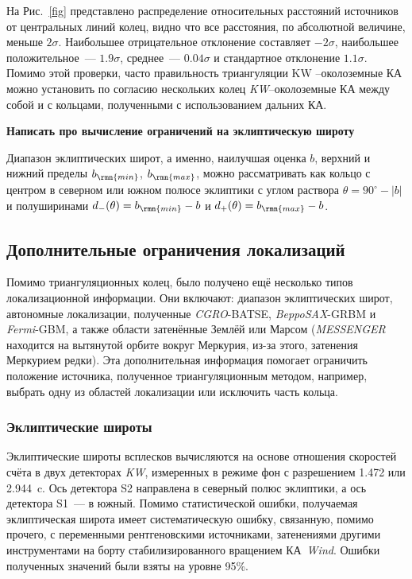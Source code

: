На Рис.~\ref{fig} представлено распределение относительных расстояний источников 
от центральных линий колец, видно что все расстояния, по абсолютной величине, меньше $2\sigma$.
Наибольшее отрицательное отклонение составляет $-2\sigma$, наибольшее положительное~---
$1.9\sigma$, среднее~--- $0.04\sigma$ и стандартное отклонение $1.1\sigma$.
Помимо этой проверки, часто правильность триангуляции KW –околоземные КА можно 
установить по согласию нескольких колец \textit{KW}--околоземные КА между собой 
и с кольцами, полученными с использованием дальних КА.

\textbf{Написать про вычисление ограничений на эклиптическую широту}

Диапазон эклиптических широт, а именно, наилучшая оценка $b$, верхний и нижний
пределы $b_{\rmn{min}}$, $b_{\rmn{max}}$, можно рассматривать как кольцо с центром в северном или южном
полюсе эклиптики с углом раствора $\theta = 90^\circ - |b|$ и полуширинами 
$d_{-}(\theta) = b_{\rmn{min}} - b$ и $d_{+}(\theta) = b_{\rmn{max}} - b$.

\subsection{Дополнительные ограничения локализаций}
Помимо триангуляционных колец, было получено ещё несколько типов локализационной информации. 
Они включают: диапазон эклиптических широт, автономные локализации, полученные 
\textit{CGRO}-BATSE, \textit{BeppoSAX}-GRBM и \textit{Fermi}-GBM, а также области 
затенённые Землёй или Марсом (\textit{MESSENGER} находится на вытянутой орбите вокруг Меркурия, из-за этого, 
затенения Меркурием редки). Эта дополнительная информация помогает ограничить 
положение источника, полученное триангуляционным методом, например, 
выбрать одну из областей локализации или исключить часть кольца.

\subsubsection{Эклиптические широты}
Эклиптические широты всплесков вычисляются на основе отношения скоростей счёта
в двух детекторах \textit{KW}, измеренных в режиме фон с разрешением 1.472 или 2.944~c. Ось
детектора S2 направлена в северный полюс эклиптики, а ось детектора S1~--- в южный.
Помимо статистической ошибки, получаемая эклиптическая широта имеет систематическую 
ошибку, связанную, помимо прочего, с переменными рентгеновскими источниками,
затенениями другими инструментами на борту стабилизированного вращением КА~\textit{Wind}.
Ошибки полученных значений были взяты на уровне 95\%.

